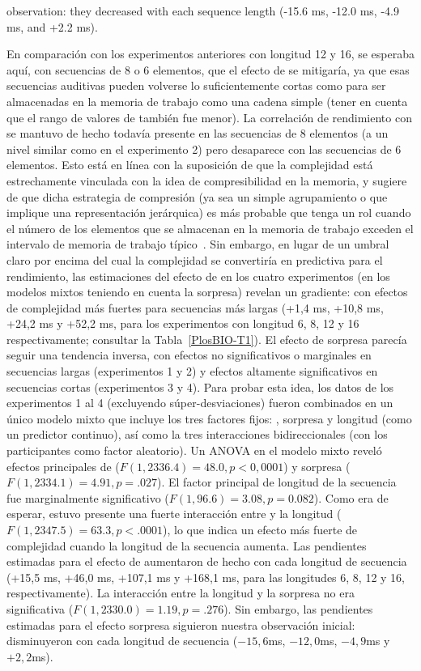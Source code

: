 observation: they decreased with each sequence length (-15.6 ms, -12.0 ms, -4.9 ms, and +2.2 ms).

En comparación con los experimentos anteriores con longitud 12 y 16, se esperaba aquí, con secuencias de 8 o 6 elementos, que el efecto de \mdlbin se mitigaría, ya que esas secuencias auditivas pueden volverse lo suficientemente cortas como para ser almacenadas en la memoria de trabajo como una cadena simple (tener en cuenta que el rango de valores de \mdlbin también fue menor). La correlación de rendimiento con \mdlbin se mantuvo de hecho todavía presente en las secuencias de 8 elementos (a un nivel similar como en el experimento 2) pero desaparece con las secuencias de 6 elementos. Esto está en línea con la suposición de que la complejidad está estrechamente vinculada con la idea de compresibilidad en la memoria, y sugiere de que dicha estrategia de compresión (ya sea un simple agrupamiento o que implique una representación jerárquica) es más probable que tenga un rol cuando el número de los elementos que se almacenan en la memoria de trabajo exceden el intervalo de memoria de trabajo típico~\cite{f16,f89}. Sin embargo, en lugar de un umbral claro por encima del cual la complejidad se convertiría en predictiva para el rendimiento, las estimaciones del efecto de \mdlbin en los cuatro experimentos (en los modelos mixtos teniendo en cuenta la sorpresa) revelan un gradiente: con efectos de complejidad más fuertes para secuencias más largas (+1,4 ms, +10,8 ms, +24,2 ms y +52,2 ms, para los experimentos con longitud 6, 8, 12 y 16 respectivamente; consultar la Tabla~\ref{PlosBIO-T1}). El efecto de sorpresa parecía seguir una tendencia inversa, con efectos no significativos o marginales en secuencias largas (experimentos 1 y 2) y efectos altamente significativos en secuencias cortas (experimentos 3 y 4). Para probar esta idea, los datos de los experimentos 1 al 4 (excluyendo súper-desviaciones) fueron combinados en un único modelo mixto que incluye los tres factores fijos: \mdlbin, sorpresa y longitud (como un predictor continuo), así como la tres interacciones bidireccionales (con los participantes como factor aleatorio). Un ANOVA en el modelo mixto reveló efectos principales de \mdlbin ($F (1, 2336.4) = 48.0, p <0,0001$) y sorpresa ($F (1, 2334.1) = 4.91, p = .027$). El factor principal de longitud de la secuencia fue marginalmente significativo ($F (1, 96.6) = 3.08, p = 0.082$). Como era de esperar, estuvo presente una fuerte interacción entre \mdlbin y la longitud ($F (1, 2347.5) = 63.3, p < .0001$), lo que indica un efecto más fuerte de complejidad cuando la longitud de la secuencia aumenta. Las pendientes estimadas para el efecto de \mdlbin aumentaron de hecho con cada longitud de secuencia (+15,5 ms, +46,0 ms, +107,1 ms y +168,1 ms, para las longitudes 6, 8, 12 y 16, respectivamente). La interacción entre la longitud y la sorpresa no era significativa ($F (1, 2330.0) = 1.19, p = .276$). Sin embargo, las pendientes estimadas para el efecto sorpresa siguieron nuestra observación inicial: disminuyeron con cada longitud de secuencia ($-15,6$ms, $-12,0$ms, $-4,9$ms y $+ 2,2$ms).

